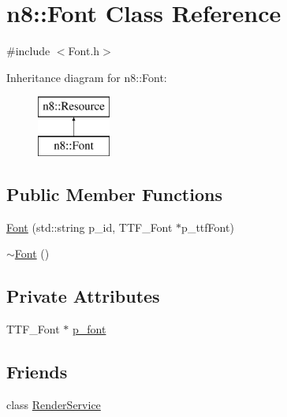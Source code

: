 \hypertarget{classn8_1_1_font}{\section{n8\-:\-:Font Class Reference}
\label{classn8_1_1_font}
}


{\ttfamily \#include $<$Font.\-h$>$}

Inheritance diagram for n8\-:\-:Font\-:\begin{figure}[H]
\begin{center}
\leavevmode
\includegraphics[height=2.000000cm]{classn8_1_1_font}
\end{center}
\end{figure}
\subsection*{Public Member Functions}
\begin{DoxyCompactItemize}
\item 
\hyperlink{classn8_1_1_font_ae8b9fc4f6c39d58dc0024dcf2b6e2cd1}{Font} (std\-::string p\-\_\-id, T\-T\-F\-\_\-\-Font $\ast$p\-\_\-ttf\-Font)
\item 
\hyperlink{classn8_1_1_font_a147906bb47587fadfa559b187d71ff32}{$\sim$\-Font} ()
\end{DoxyCompactItemize}
\subsection*{Private Attributes}
\begin{DoxyCompactItemize}
\item 
T\-T\-F\-\_\-\-Font $\ast$ \hyperlink{classn8_1_1_font_a4f366d0c324efb7daa5deadd187bb290}{p\-\_\-font}
\end{DoxyCompactItemize}
\subsection*{Friends}
\begin{DoxyCompactItemize}
\item 
class \hyperlink{classn8_1_1_font_aedde775898ebe0d7c84c0060e1c9d770}{Render\-Service}
\end{DoxyCompactItemize}


